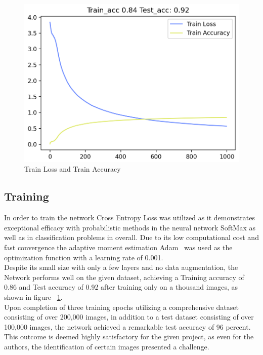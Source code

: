 \documentclass[@CLASSOPTIONS@]{tumarticle}
\begin{document}
\begin{figure}
    \begin{minipage}{0.48\textwidth}
     \centering
     \includegraphics[width=.9\linewidth]{figures/train_plot}
     \caption{Train Loss and Train Accuracy}\label{Fig:tp}
   \end{minipage}
\end{figure}

\subsection{Training}

In order to train the network Cross Entropy Loss was utilized as it demonstrates exceptional efficacy with probabilistic
methods in the neural network SoftMax as well as in classification problems in overall.
Due to its low computational cost and fast convergence the adaptive moment estimation Adam~\cite{Adam} was used as the optimization
function with a learning rate of 0.001.\\
Despite its small size with only a few layers and no data augmentation, the Network performs well on the given dataset,
achieving a Training accuracy of 0.86 and Test accuracy of 0.92 after training only on a thousand images, as shown in
figure ~\ref{Fig:tp}.\\
Upon completion of three training epochs utilizing a comprehensive dataset consisting of over 200,000 images, in
addition to a test dataset consisting of over 100,000 images, the network achieved a remarkable test accuracy of 96 percent.
This outcome is deemed highly satisfactory for the given project, as even for the authors, the identification of certain
images presented a challenge.\\
\end{document}
